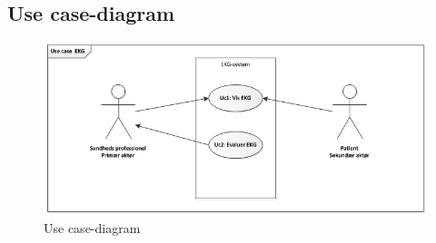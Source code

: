 \subsection{Use case-diagram}

\begin{figure}[htb]
	\centering
	\includegraphics[width=1\textwidth]{Figurer/Snip20150226_2}
	\caption{Use case-diagram}
	\label{fig:Use Cases}
\end{figure}


















